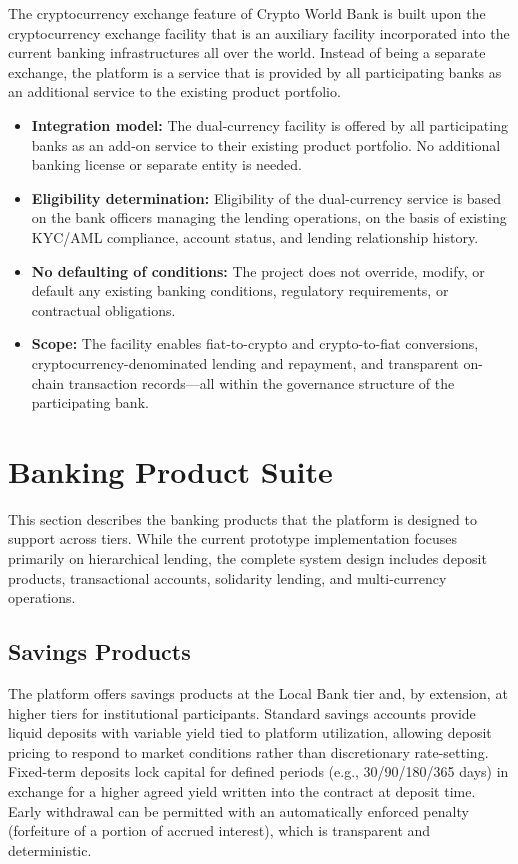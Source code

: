 \documentclass[12pt,a4paper]{report}
\begin{document}
The cryptocurrency exchange feature of Crypto World Bank is built upon the cryptocurrency exchange facility that is an auxiliary facility incorporated into the current banking infrastructures all over the world. Instead of being a separate exchange, the platform is a service that is provided by all participating banks as an additional service to the existing product portfolio.

\begin{itemize}[noitemsep]
\item \textbf{Integration model:} The dual-currency facility is offered by all participating banks as an add-on service to their existing product portfolio. No additional banking license or separate entity is needed.
\item \textbf{Eligibility determination:} Eligibility of the dual-currency service is based on the bank officers managing the lending operations, on the basis of existing KYC/AML compliance, account status, and lending relationship history.
\item \textbf{No defaulting of conditions:} The project does not override, modify, or default any existing banking conditions, regulatory requirements, or contractual obligations.
\item \textbf{Scope:} The facility enables fiat-to-crypto and crypto-to-fiat conversions, cryptocurrency-denominated lending and repayment, and transparent on-chain transaction records---all within the governance structure of the participating bank.
\end{itemize}

\section{Banking Product Suite}
\label{sec:banking-products}

This section describes the banking products that the platform is designed to support across tiers. While the current prototype implementation focuses primarily on hierarchical lending, the complete system design includes deposit products, transactional accounts, solidarity lending, and multi-currency operations.

\subsection{Savings Products}

The platform offers savings products at the Local Bank tier and, by extension, at higher tiers for institutional participants. Standard savings accounts provide liquid deposits with variable yield tied to platform utilization, allowing deposit pricing to respond to market conditions rather than discretionary rate-setting. Fixed-term deposits lock capital for defined periods (e.g., 30/90/180/365 days) in exchange for a higher agreed yield written into the contract at deposit time. Early withdrawal can be permitted with an automatically enforced penalty (forfeiture of a portion of accrued interest), which is transparent and deterministic.
\end{document}
